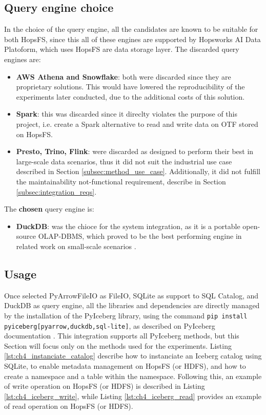 \subsection{Query engine choice}
\label{subsec:integration_engine_choice}
In the choice of the query engine, all the candidates are known to be suitable for both \gls{HopsFS}, since this all of these engines are supported by Hopsworks AI Data Platoform, which uses HopsFS are data storage layer. The discarded query engines are:
\begin{itemize}
    \item \textbf{\gls{AWS} Athena and Snowflake}: both were discarded since they are proprietary solutions. This would have lowered the reproducibility of the experiments later conducted, due to the additional costs of this solution.
    \item \textbf{Spark}: this was discarded since it direclty violates the purpose of this project, i.e. create a Spark alternative to read and write data on \gls{OTF} stored on \gls{HopsFS}.
    \item \textbf{Presto, Trino, Flink}: were discarded as designed to perform their best in large-scale data scenarios, thus it did not suit the  industrial use case described in Section \ref{subsec:method_use_case}. Additionally, it did not fulfill the maintainability not-functional requirement, describe in Section \ref{subsec:integration_reqs}.
\end{itemize}
The \textbf{chosen} query engine is:
\begin{itemize}
    \item \textbf{DuckDB}: was the chioce for the system integration, as it is a portable open-source \gls{OLAP}-\gls{DBMS}, which proved to be the best performing engine in related work on small-scale scenarios \cite{raasveldtDuckDBEmbeddableAnalytical2019,Khazanchi1801362}.
\end{itemize}


\subsection{Usage}
\label{subsec:integration_usage}
Once selected PyArrowFileIO as FileIO, SQLite as support to SQL Catalog, and DuckDB as query engine, all the libraries and dependencies are directly managed by the installation of the PyIceberg library, using the command \verb|pip install pyiceberg[pyarrow,duckdb,sql-lite]|, as described on PyIceberg documentation \cite{iceberg_tech_docs}. This integration supports all PyIceberg methods, but this Section will focus only on the methods used for the experiments. Listing \ref{lst:ch4_instanciate_catalog} describe how to instanciate an Iceberg catalog using SQLite, to enable metadata management on \gls{HopsFS} (or \gls{HDFS}), and how to create a namespace and a table within the namespace. Following this, an example of write operation on \gls{HopsFS} (or \gls{HDFS}) is described in Listing \ref{lst:ch4_iceberg_write}, while Listing \ref{lst:ch4_iceberg_read} provides an example of read operation on \gls{HopsFS} (or \gls{HDFS}).


